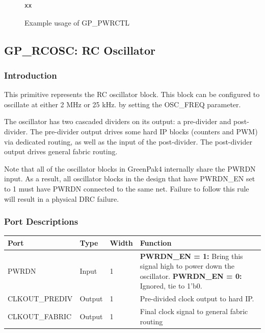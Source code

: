 \documentclass[11pt]{article}
\begin{document}
\begin{figure}[h]
\begin{lstlisting}
xx
\end{lstlisting}
\caption{Example usage of GP\_PWRCTL}
\label{gp-pwrctl-example}
\end{figure}


\pagebreak
\subsection{GP\_RCOSC: RC Oscillator}

\subsubsection{Introduction}
This primitive represents the RC oscillator block. This block can be configured to oscillate at either 2 MHz or 25 kHz. 
by setting the OSC\_FREQ parameter.

The oscillator has two cascaded dividers on its output: a pre-divider and post-divider. The pre-divider output drives 
some hard IP blocks (counters and PWM) via dedicated routing, as well as the input of the post-divider. The 
post-divider output drives general fabric routing.

Note that all of the oscillator blocks in GreenPak4 internally share the PWRDN input. As a result, all oscillator 
blocks in the design that have PWRDN\_EN set to 1 must have PWRDN connected to the same net. Failure to follow this 
rule will result in a physical DRC failure.

\subsubsection{Port Descriptions}

\begin{tabularx}{5in}{|l|l|l|X|}
\hline
{\bfseries Port} & {\bfseries Type} & {\bfseries Width} & {\bfseries Function} \\
\hline
PWRDN & Input & 1 &
	{\bfseries PWRDN\_EN = 1:} \newline Bring this signal high to power down the oscillator. \newline
	{\bfseries PWRDN\_EN = 0:} \newline Ignored, tie to 1'b0.\\
\hline
CLKOUT\_PREDIV & Output & 1 & Pre-divided clock output to hard IP.  \\
\hline
CLKOUT\_FABRIC & Output & 1 & Final clock signal to general fabric routing\\
\hline
\end{tabularx}
\end{document}
